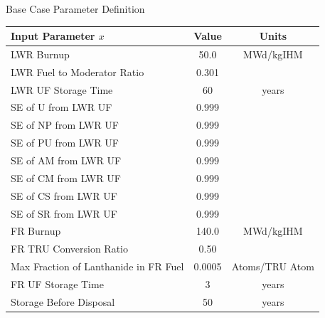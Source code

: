 \documentclass[pdf, autumn, slideColor, nocolorBG]{prosper}
\begin{document}
\begin{slide}{Base Case Parameter Definition}
\tiny
\begin{center}
\begin{tabular}{|l||c|c|}
\hline
\textbf{Input Parameter $x$} & \textbf{Value} & \textbf{Units} \\
\hline
LWR Burnup & 50.0 & MWd/kgIHM \\
\hline
LWR Fuel to Moderator Ratio & 0.301 & \\
\hline
LWR UF Storage Time & 60 & years \\
\hline
SE of U from LWR UF & 0.999 & \\
\hline
SE of NP from LWR UF & 0.999 & \\
\hline
SE of PU from LWR UF & 0.999 & \\
\hline
SE of AM from LWR UF & 0.999 & \\
\hline
SE of CM from LWR UF & 0.999 & \\
\hline
SE of CS from LWR UF & 0.999 & \\
\hline
SE of SR from LWR UF & 0.999 & \\
\hline
FR Burnup & 140.0 & MWd/kgIHM \\
\hline
FR TRU Conversion Ratio & 0.50 & \\
\hline
Max Fraction of Lanthanide in FR Fuel & 0.0005 & Atoms/TRU Atom \\
\hline
FR UF Storage Time & 3 & years \\
\hline
Storage Before Disposal & 50 & years \\
\hline
\end{tabular}
\end{center}
\end{slide}
\end{document}
